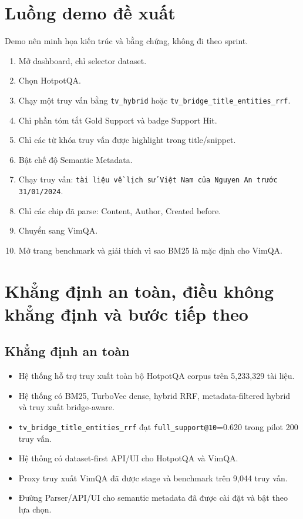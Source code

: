 \documentclass[11pt,a4paper]{article}
\newcommand{\method}[1]{\texttt{#1}}
\newcommand{\metric}[1]{\texttt{#1}}
\begin{document}
\section{Luồng demo đề xuất}

Demo nên minh họa kiến trúc và bằng chứng, không đi theo sprint.

\begin{enumerate}
  \item Mở dashboard, chỉ selector dataset.
  \item Chọn HotpotQA.
  \item Chạy một truy vấn bằng \method{tv\_hybrid} hoặc \method{tv\_bridge\_title\_entities\_rrf}.
  \item Chỉ phần tóm tắt Gold Support và badge Support Hit.
  \item Chỉ các từ khóa truy vấn được highlight trong title/snippet.
  \item Bật chế độ Semantic Metadata.
  \item Chạy truy vấn: \texttt{tài liệu về lịch sử Việt Nam của Nguyen An trước 31/01/2024}.
  \item Chỉ các chip đã parse: Content, Author, Created before.
  \item Chuyển sang VimQA.
  \item Mở trang benchmark và giải thích vì sao BM25 là mặc định cho VimQA.
\end{enumerate}

\section{Khẳng định an toàn, điều không khẳng định và bước tiếp theo}

\subsection{Khẳng định an toàn}

\begin{itemize}
  \item Hệ thống hỗ trợ truy xuất toàn bộ HotpotQA corpus trên 5,233,329 tài liệu.
  \item Hệ thống có BM25, TurboVec dense, hybrid RRF, metadata-filtered hybrid và truy xuất bridge-aware.
  \item \method{tv\_bridge\_title\_entities\_rrf} đạt \metric{full\_support@10}=0.620 trong pilot 200 truy vấn.
  \item Hệ thống có dataset-first API/UI cho HotpotQA và VimQA.
  \item Proxy truy xuất VimQA đã được stage và benchmark trên 9,044 truy vấn.
  \item Đường Parser/API/UI cho semantic metadata đã được cài đặt và bật theo lựa chọn.
\end{itemize}
\end{document}
